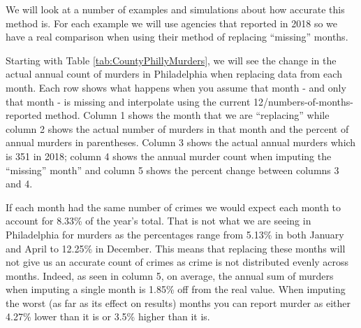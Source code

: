 \documentclass[
]{krantz}
\begin{document}
We will look at a number of examples and simulations about
how accurate this method is. For each example we will use
agencies that reported in 2018 so we have a real comparison
when using their method of replacing ``missing'' months.

Starting with Table \ref{tab:CountyPhillyMurders}, we will
see the change in the actual annual count of murders in
Philadelphia when replacing data from each month. Each row
shows what happens when you assume that month - and only
that month - is missing and interpolate using the current
12/numbers-of-months-reported method. Column 1 shows the
month that we are ``replacing'' while column 2 shows the
actual number of murders in that month and the percent of
annual murders in parentheses. Column 3 shows the actual
annual murders which is 351 in 2018; column 4 shows the
annual murder count when imputing the ``missing'' month''
and column 5 shows the percent change between columns 3 and
4.

If each month had the same number of crimes we would expect
each month to account for 8.33\% of the year's total. That
is not what we are seeing in Philadelphia for murders as the
percentages range from 5.13\% in both January and April to
12.25\% in December. This means that replacing these months
will not give us an accurate count of crimes as crime is not
distributed evenly across months. Indeed, as seen in column
5, on average, the annual sum of murders when imputing a
single month is 1.85\% off from the real value. When
imputing the worst (as far as its effect on results) months
you can report murder as either 4.27\% lower than it is or
3.5\% higher than it is.
\end{document}
